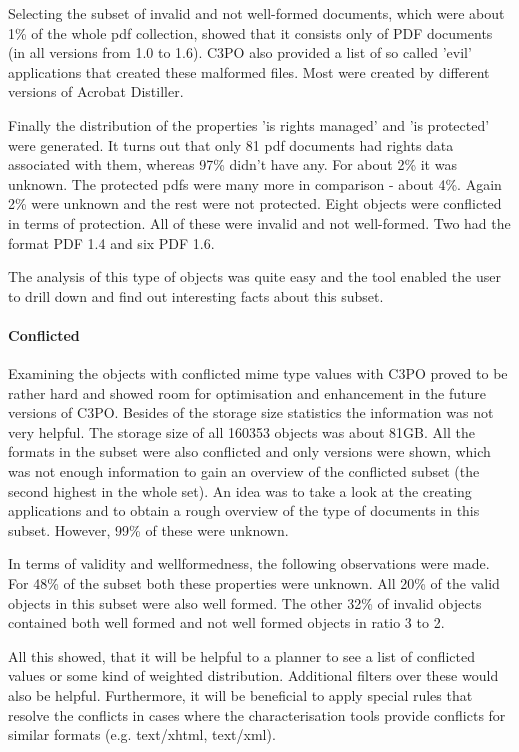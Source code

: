 Selecting the subset of invalid and not well-formed documents, which were about 1\% of the whole pdf collection, showed that it consists only of PDF documents (in all versions from 1.0 to 1.6).
C3PO also provided a list of so called 'evil' applications that created these malformed files.
Most were created by different versions of Acrobat Distiller.

Finally the distribution of the properties 'is rights managed' and 'is protected' were generated.
It turns out that only 81 pdf documents had rights data associated with them, whereas 97\% didn't have any.
For about 2\% it was unknown.
The protected pdfs were many more in comparison - about 4\%.
Again 2\% were unknown and the rest were not protected.
Eight objects were conflicted in terms of protection.
All of these were invalid and not well-formed. Two had the format PDF 1.4 and six PDF 1.6.

The analysis of this type of objects was quite easy and the tool enabled the user to drill down and find out interesting facts about this subset.

\paragraph{Conflicted}
Examining the objects with conflicted mime type values with C3PO proved to be rather hard and showed room for optimisation and enhancement in the future versions of C3PO.
Besides of the storage size statistics the information was not very helpful.
The storage size of all 160353 objects was about 81GB.
All the formats in the subset were also conflicted and only versions were shown, which was not enough information to gain an overview of the conflicted subset (the second highest in the whole set).
An idea was to take a look at the creating applications and to obtain a rough overview of the type of documents in this subset.
However, 99\% of these were unknown.

In terms of validity and wellformedness, the following observations were made.
For 48\% of the subset both these properties were unknown.
All 20\% of the valid objects in this subset were also well formed.
The other 32\% of invalid objects contained both well formed and not well formed objects in ratio 3 to 2.

All this showed, that it will be helpful to a planner to see a list of conflicted values or some kind of weighted distribution. 
Additional filters over these would also be helpful.
Furthermore, it will be beneficial to apply special rules that resolve the conflicts in cases where the characterisation tools provide conflicts for similar formats (e.g. text/xhtml, text/xml).

